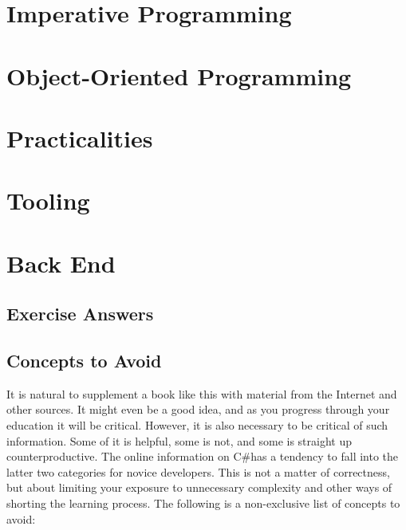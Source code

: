\documentclass[a4paper, oneside]{memoir}
\newcommand{\csharp}{C{\lserif\#}}
\begin{document}





\part{Imperative Programming}







\part{Object-Oriented Programming}







\part{Practicalities}





\part{Tooling}






\part{Back End}
\appendix

\chapter{Exercise Answers}


\chapter{Concepts to Avoid}

It is natural to supplement a book like this with material from the Internet and other sources. It might even be a good idea, and as you progress through your education it will be critical. However, it is also necessary to be critical of such information. Some of it is helpful, some is not, and some is straight up counterproductive. The online information on \csharp has a tendency to fall into the latter two categories for novice developers. This is not a matter of correctness, but about limiting your exposure to unnecessary complexity and other ways of shorting the learning process. The following is a non-exclusive list of concepts to avoid:
\end{document}

